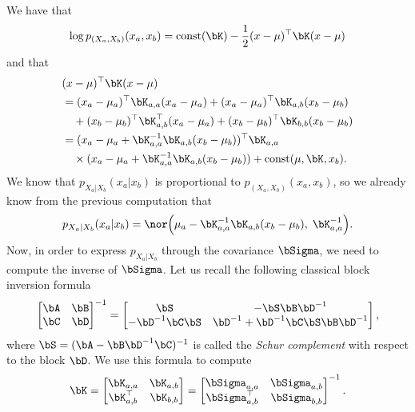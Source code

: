 We have that
\begin{align*}
	\log p_{(X_a, X_b)}(x_a, x_b) = \text{const}(\bK) - \frac 12 (x - \mu)^\top \bK (x - \mu)
\end{align*}
and that
\begin{align*}
	&(x - \mu)^\top \bK (x - \mu) \\
	&= (x_a - \mu_a)^\top \bK_{a,a} (x_a - \mu_a) + (x_a - \mu_a)^\top \bK_{a, b} (x_b - \mu_b) \\
	&\quad + (x_b - \mu_b)^\top \bK_{a,b}^\top (x_a - \mu_a) + (x_b - \mu_b)^\top \bK_{b,b} (x_b - \mu_b) \\
	&= (x_a - \mu_a + \bK_{a,a}^{-1} \bK_{a,b} (x_b - \mu_b))^\top \bK_{a, a} \\
	& \quad \times (x_a - \mu_a + \bK_{a,a}^{-1} \bK_{a,b} (x_b - \mu_b)) + \text{const}(\mu, \bK, x_b).
\end{align*}
We know that $p_{X_a | X_b}(x_a | x_b)$ is proportional to $p_{(X_a, X_b)}(x_a, x_b)$, so we already know from the previous computation that
\begin{equation*}
	p_{X_a | X_b}(x_a | x_b) = 
	\nor \Big( \mu_a - \bK_{a, a}^{-1} \bK_{a, b} (x_b - \mu_b), 
	\; \bK_{a, a}^{-1} \Big).
\end{equation*}
Now, in order to express $p_{X_a | X_b}$ through the covariance $\bSigma$, we need to compute the inverse of $\bSigma$.
Let us recall the following classical block inversion formula
\begin{equation*}
	\begin{bmatrix}
	\bA & \bB \\
	\bC & \bD		
	\end{bmatrix}^{-1}
	=
	\begin{bmatrix}
		\bS & - \bS \bB \bD^{-1} \\
		- \bD^{-1} \bC \bS & \bD^{-1} + \bD^{-1} \bC \bS \bB \bD^{-1}
	\end{bmatrix},
\end{equation*}
where $\bS = (\bA - \bB \bD^{-1} \bC)^{-1}$ is called the \emph{Schur complement} with respect to the block $\bD$.
We use this formula to compute
\begin{equation*}
	\bK = 
	\begin{bmatrix}
		\bK_{a, a} & \bK_{a, b} \\
		\bK_{a, b}^\top & \bK_{b, b}
	\end{bmatrix}
	= 
	\begin{bmatrix}
		\bSigma_{a, a} & \bSigma_{a, b} \\
		\bSigma_{a, b}^\top & \bSigma_{b, b}
	\end{bmatrix}^{-1}.
\end{equation*}
